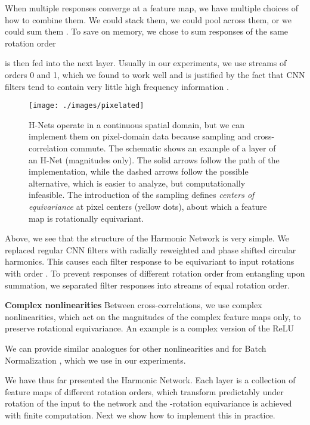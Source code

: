\documentclass[10pt,twocolumn,letterpaper]{article}
\begin{document}
When multiple responses converge at a feature map, we have multiple choices of how to combine them. We could stack them, we could pool across them, or we could sum them \cite{dieleman2016exploiting}. To save on memory, we chose to sum responses of the same rotation order

 is then fed into the next layer. Usually in our experiments, 
we use streams of orders 0 and 1, which we found to work well and is justified by the fact that CNN filters tend to contain very little high frequency information \cite{jacobsen2016structure}.
\begin{figure}[t]
	\centering
	\texttt{[image: ./images/pixelated]}
    \caption{H-Nets operate in a continuous spatial domain, but we can
    implement them on pixel-domain data because sampling and 
    cross-correlation commute. The schematic shows an example of 
    a layer of an H-Net (magnitudes only). The solid arrows follow 
    the path of the implementation, while the dashed arrows follow 
    the possible alternative, which is easier to analyze, but 
    computationally infeasible. The introduction
    of the sampling defines \emph{centers of equivariance} at 
    pixel centers (yellow dots), about which a feature map is 
    rotationally equivariant. }
    \label{fig:sampling_grid}
\vspace{-1em}
\end{figure}

Above, we see that the structure of the Harmonic Network is very
simple. We replaced regular CNN filters with radially reweighted and
phase shifted circular harmonics. This causes each filter response to be
equivariant to input rotations with order . To prevent responses of 
different rotation order from entangling upon summation, we separated
filter responses into streams of equal rotation order.

\textbf{Complex nonlinearities}
\label{sec:complex_nonlinearities}
Between cross-correlations, we use complex nonlinearities, which act on the 
magnitudes of the complex feature maps only, to preserve rotational equivariance.
An example is a complex version of the ReLU

We can provide similar analogues for other nonlinearities and for Batch 
Normalization \cite{ioffe2015bn}, which we use in our experiments.

We have thus far presented the Harmonic Network. Each layer is a collection
of feature maps of different rotation orders, which transform predictably
under rotation of the input to the network and the -rotation 
equivariance is achieved with finite computation. Next we show how to 
implement this in practice.
\end{document}
